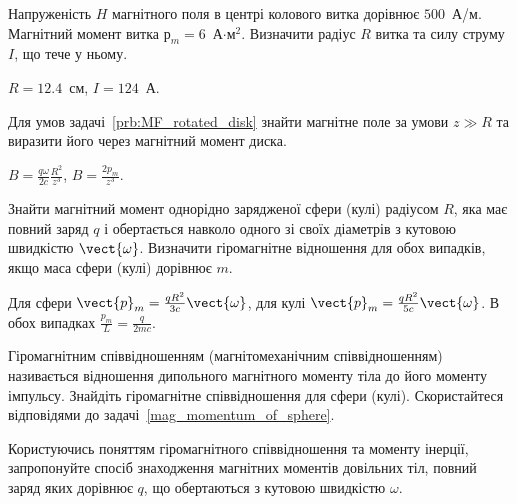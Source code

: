 \begin{problem}%
Напруженість $H$ магнітного поля в центрі колового витка
дорівнює $500$~А/м. Магнітний момент витка $р_m = 6$~А$\cdot$м$^2$.
Визначити радіус $R$ витка та силу струму $I$, що тече у ньому.
\begin{solution}
$R = 12.4$~см, $I = 124$~А.
\end{solution}
\end{problem}



\begin{problem}
Для умов задачі~\ref{prb:MF_rotated_disk} знайти магнітне поле за умови $z \gg R$ та виразити його через магнітний момент диска.
\begin{solution}
	$B = \frac{q\omega}{2c}\frac{R^2}{z^3}$, $B = \frac{2p_m}{z^3}$.
\end{solution}
\end{problem}

\begin{problem}\label{mag_momentum_of_sphere}
Знайти магнітний момент однорідно зарядженої сфери (кулі) радіусом $R$, яка має повний заряд $q$ і обертається навколо одного зі своїх діаметрів з кутовою швидкістю $\vect{\omega}$. Визначити гіромагнітне відношення для обох випадків, якщо маса сфери (кулі) дорівнює $m$.
\begin{solution}
	Для сфери $\vect{p}_m = \frac{qR^2}{3c}\vect{\omega}$,
	для кулі $\vect{p}_m = \frac{qR^2}{5c}\vect{\omega}$.
	В обох випадках $\frac{p_m}{L} = \frac{q}{2mc}$.
\end{solution}
\end{problem}

\begin{problem}
    Гіромагнітним співвідношенням (магнітомеханічним співвідношенням) називається відношення дипольного магнітного моменту тіла до його моменту імпульсу. Знайдіть гіромагнітне співвідношення для сфери (кулі). Скористайтеся відповідями до задачі~\ref{mag_momentum_of_sphere}.
\end{problem}

\begin{problem}
    Користуючись поняттям гіромагнітного співвідношення та моменту інерції, запропонуйте спосіб знаходження магнітних моментів довільних тіл, повний заряд яких дорівнює $q$, що обертаються з кутовою швидкістю $\omega$.
\end{problem}



